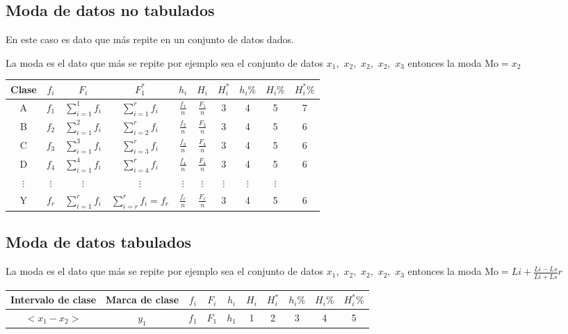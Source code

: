 \documentclass[10pt,]{krantz}
\theoremstyle{definition}
\theoremstyle{definition}
\theoremstyle{definition}
\theoremstyle{remark}
\begin{document}
\hypertarget{moda-de-datos-no-tabulados}{%
\subsection{Moda de datos no tabulados}\label{moda-de-datos-no-tabulados}}

En este caso es dato que más repite en un conjunto de datos dados.

La moda es el dato que más se repite por ejemplo sea el conjunto de datos \(x_1,\) \(x_2,\) \(x_2,\) \(x_2,\) \(x_3\) entonces la moda \(\text{Mo}=x_2\)

\begin{longtable}[]{@{}cccccccccc@{}}
\toprule
Clase & \(f_i\) & \(F_i\) & \(F_1^*\) & \(h_i\) & \(H_i\) & \(H_i^*\) & \(h_i\%\) & \(H_i\%\) & \(H_i^*\%\)\tabularnewline
\midrule
\endhead
A & \(f_1\) & \(\sum_{i=1}^1f_i\) & \(\sum_{i=1}^rf_i\) & \(\frac{f_1}{n}\) & \(\frac{F_1}{n}\) & 3 & 4 & 5 & 7\tabularnewline
B & \(f_2\) & \(\sum_{i=1}^2f_i\) & \(\sum_{i=2}^rf_i\) & \(\frac{f_2}{n}\) & \(\frac{F_2}{n}\) & 3 & 4 & 5 & 6\tabularnewline
C & \(f_3\) & \(\sum_{i=1}^3f_i\) & \(\sum_{i=3}^rf_i\) & \(\frac{f_3}{n}\) & \(\frac{F_3}{n}\) & 3 & 4 & 5 & 6\tabularnewline
D & \(f_4\) & \(\sum_{i=1}^4f_i\) & \(\sum_{i=4}^rf_i\) & \(\frac{f_4}{n}\) & \(\frac{F_4}{n}\) & 3 & 4 & 5 & 6\tabularnewline
\(\vdots\) & \(\vdots\) & \(\vdots\) & \(\vdots\) & \(\vdots\) & \(\vdots\) & \(\vdots\) & \(\vdots\) & \(\vdots\) &\tabularnewline
Y & \(f_r\) & \(\sum_{i=1}^rf_i\) & \(\sum_{i=r}^r f_i=f_r\) & \(\frac{f_r}{n}\) & \(\frac{F_r}{n}\) & 3 & 4 & 5 & 6\tabularnewline
\bottomrule
\end{longtable}

\hypertarget{moda-de-datos-tabulados}{%
\subsection{Moda de datos tabulados}\label{moda-de-datos-tabulados}}

La moda es el dato que más se repite por ejemplo sea el conjunto de datos \(x_1,\) \(x_2,\) \(x_2,\) \(x_2,\) \(x_3\) entonces la moda \(\text{Mo}=Li+\frac{Li-Ls}{Li+Ls}r\)

\begin{longtable}[]{@{}cccccccccc@{}}
\toprule
Intervalo de clase & Marca de clase & \(f_i\) & \(F_i\) & \(h_i\) & \(H_i\) & \(H_i^*\) & \(h_i\%\) & \(H_i\%\) & \(H_i^*\%\)\tabularnewline
\midrule
\endhead
\(<x_1-x_2>\) & \(y_1\) & \(f_1\) & \(F_1\) & \(h_1\) & 1 & 2 & 3 & 4 & 5\tabularnewline
\bottomrule
\end{longtable}
\end{document}
